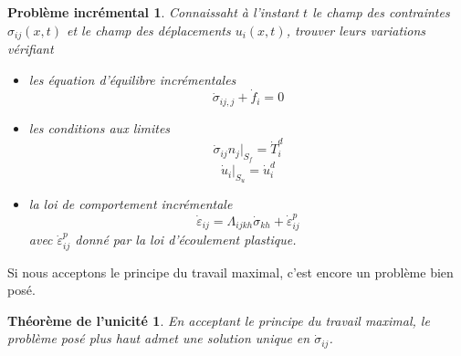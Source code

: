 \newtheorem*{PrInc}{Problème incrémental}
\begin{PrInc}
    Connaissaht à l'instant $t$ le champ des contraintes $\sigma_{ij}(x,t)$ et le champ des déplacements $u_i(x,t)$, trouver leurs variations vérifiant 
    \begin{itemize}
        \item les équation d'équilibre incrémentales 
            \begin{equation}
                \dot{\sigma}_{ij,j} + \dot{f}_i = 0
                \label{eq:Ch10-043}
            \end{equation}
        \item les conditions aux limites 
            \begin{equation}
                \dot{\sigma}_{ij} n_j|_{S_f} = \dot{T}_i^d
                \label{eq:Ch10-044}
            \end{equation}
            \begin{equation}
                \dot{u}_i|_{S_u} = \dot{u}_i^d
                \label{eq:Ch10-045}
            \end{equation}
        \item la loi de comportement incrémentale 
            \begin{equation}
                \dot{\varepsilon}_{ij} = \Lambda_{ijkh} \dot{\sigma}_{kh} + \dot{\varepsilon}_{ij}^p
                \label{eq:Ch10-046}
            \end{equation}
            avec $\dot{\varepsilon}_{ij}^p$ donné par la loi d'écoulement plastique.
    \end{itemize}
\end{PrInc}
Si nous acceptons le principe du travail maximal, c'est encore 
un problème bien posé.
\newtheorem*{ThUni}{Théorème de l'unicité}
\begin{ThUni}
    En acceptant le principe du travail maximal, le problème posé plus haut admet une solution unique en $\dot{\sigma}_{ij}$.
\end{ThUni}
